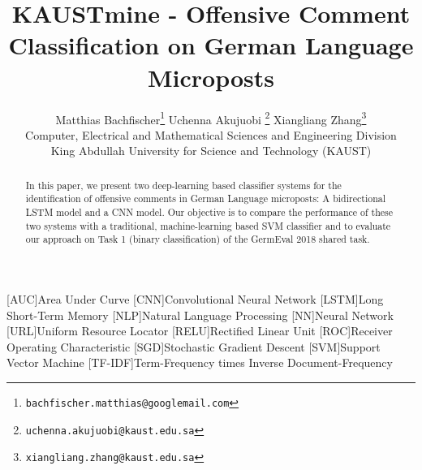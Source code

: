\documentclass[11pt]{article}
\title{KAUSTmine - Offensive Comment Classification on German Language Microposts}
\author{Matthias Bachfischer\thanks{\tt \space bachfischer.matthias@googlemail.com} \qquad Uchenna Akujuobi \thanks{\tt  \space uchenna.akujuobi@kaust.edu.sa} \qquad Xiangliang Zhang\thanks{\tt  \space xiangliang.zhang@kaust.edu.sa} \\
   Computer, Electrical and Mathematical Sciences and Engineering Division \\
     King Abdullah University for Science and Technology (KAUST) \\
}
\date{}
\begin{document}
\begin{acronym}[\hspace{1.8cm}]
[AUC]{Area Under Curve}
[CNN]{Convolutional Neural Network}
[LSTM]{Long Short-Term Memory}
 [NLP]{Natural Language Processing}
 [NN]{Neural Network}
 [URL]{Uniform Resource Locator}
 [RELU]{Rectified Linear Unit}
 [ROC]{Receiver Operating Characteristic}
 [SGD]{Stochastic Gradient Descent}
[SVM]{Support Vector Machine}
[TF-IDF]{Term-Frequency times Inverse Document-Frequency}

\end{acronym}

\maketitle
\begin{abstract}
In this paper, we present two deep-learning based classifier systems for the identification of offensive comments in German Language microposts: A bidirectional LSTM model and a CNN model. Our objective is to compare the performance of these two systems with a traditional, machine-learning based SVM classifier and to evaluate our approach on Task 1 (binary classification) of the GermEval 2018 shared task.
\end{abstract}

\nocite{RN65}
\end{document}
